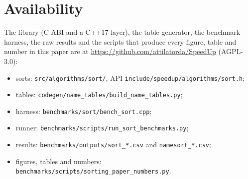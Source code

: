 \documentclass[11pt]{article}
\theoremstyle{definition}
\begin{document}
\section*{Availability}\label{sec:avail}

The library (C ABI and a C++17 layer), the table generator, the benchmark
harness, the raw results and the scripts that produce every figure, table and
number in this paper are at \url{https://github.com/attilatorda/SpeedUp}
(AGPL-3.0):
\begin{itemize}
\item sorts: \nolinkurl{src/algorithms/sort/}, API \nolinkurl{include/speedup/algorithms/sort.h};
\item tables: \nolinkurl{codegen/name_tables/build_name_tables.py};
\item harness: \nolinkurl{benchmarks/sort/bench_sort.cpp};
\item runner: \nolinkurl{benchmarks/scripts/run_sort_benchmarks.py};
\item results: \nolinkurl{benchmarks/outputs/sort_*.csv} and \nolinkurl{namesort_*.csv};
\item figures, tables and numbers: \nolinkurl{benchmarks/scripts/sorting_paper_numbers.py}.
\end{itemize}



\end{document}
